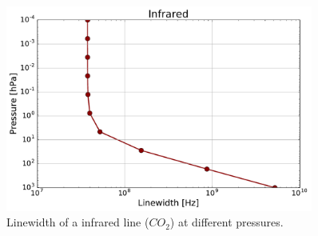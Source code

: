 \documentclass[paper=a4, fontsize=11pt]{scrartcl} %
\begin{document}
\begin{figure}[ht]
  \includegraphics[width=0.9\textwidth]{plots/ir_linewidth.pdf}
  \caption{Linewidth of a infrared line ($CO_2$) at different pressures.}
  \label{fig:ir_linewidth}
\end{figure}
\end{document}
